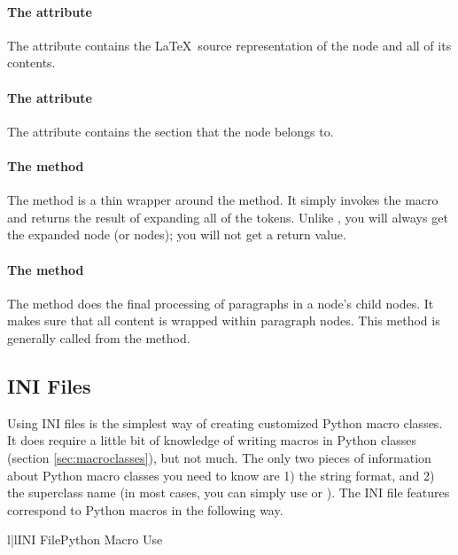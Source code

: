 \paragraph{The  attribute}
The  attribute contains the \LaTeX\ source representation
of the node and all of its contents.

\paragraph{The  attribute}
The  attribute contains the section that the
node belongs to.

\paragraph{The  method}
The  method is a thin wrapper around the 
method.  It simply invokes the macro and returns the result of
expanding all of the tokens.  Unlike , you will
always get the expanded node (or nodes); you will not get a 
return value.

\paragraph{The  method}
The  method does the final processing of paragraphs
in a node's child nodes.  It makes sure that all content is wrapped
within paragraph nodes.  This method is generally called from the
 method.


\subsection{INI Files\label{sec:inimacros}}

Using INI files is the simplest way of creating customized Python macro
classes.  It does require a little bit of knowledge of writing
macros in Python classes (section \ref{sec:macroclasses}), but not
much.  The only two pieces of information about Python macro classes
you need to know are 1) the  string format, and 2)
the superclass name (in most cases, you can simply use 
or ).  The INI file features correspond to Python
macros in the following way.
\begin{tableii}{l|l}{}{INI File}{Python Macro Use}
\end{tableii}

